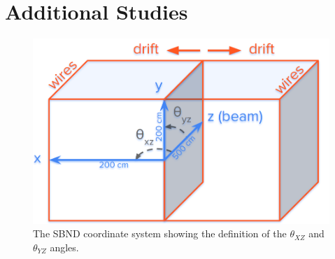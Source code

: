 \chapter{Additional Studies}
\label{chap:Additional Studies}

\begin{figure}
    \centering
    \includegraphics[width =\largefigwidth]{Figures/SBND_geometry.png}
    \caption{The SBND coordinate system showing the definition of the $\theta_{XZ}$ and $\theta_{YZ}$ angles.}
    \label{fig:my_label}
\end{figure}

